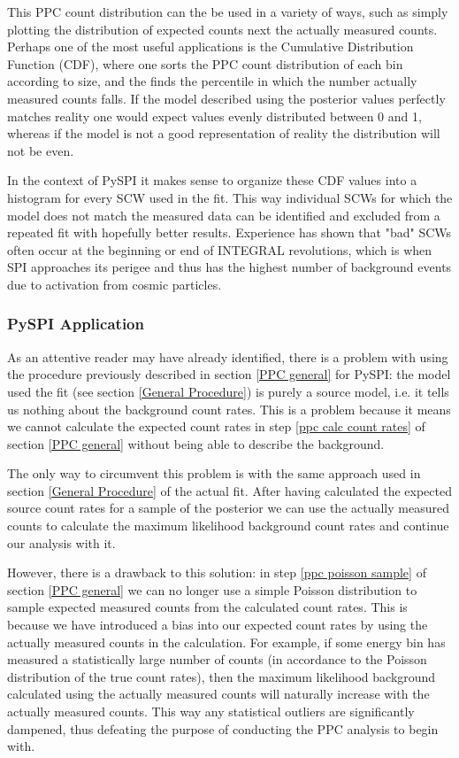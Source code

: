 \documentclass{report}
\begin{document}
This PPC count distribution can the be used in a variety of ways, such as simply plotting the distribution of expected counts next the actually measured counts. Perhaps one of the most useful applications is the Cumulative Distribution Function (CDF), where one sorts the PPC count distribution of each bin according to size, and the finds the percentile in which the number actually measured counts falls. If the model described using the posterior values perfectly matches reality one would expect values evenly distributed between 0 and 1, whereas if the model is not a good representation of reality the distribution will not be even. 

In the context of PySPI it makes sense to organize these CDF values into a histogram for every SCW used in the fit. This way individual SCWs for which the model does not match the measured data can be identified and excluded from a repeated fit with hopefully better results. Experience has shown that "bad" SCWs often occur at the beginning or end of INTEGRAL revolutions, which is when SPI approaches its perigee and thus has the highest number of background events due to activation from cosmic particles. 

\subsubsection{PySPI Application}
As an attentive reader may have already identified, there is a problem with using the procedure previously described in section \ref{PPC general} for PySPI: the model used the fit (see section \ref{General Procedure}) is purely a source model, i.e. it tells us nothing about the background count rates. This is a problem because it means we cannot calculate the expected count rates in step \ref{ppc calc count rates} of section \ref{PPC general} without being able to describe the background.

The only way to circumvent this problem is with the same approach used in section \ref{General Procedure} of the actual fit. After having calculated the expected source count rates for a sample of the posterior we can use the actually measured counts to calculate the maximum likelihood background count rates and continue our analysis with it.

However, there is a drawback to this solution: in step \ref{ppc poisson sample} of section \ref{PPC general} we can no longer use a simple Poisson distribution to sample expected measured counts from the calculated count rates. This is because we have introduced a bias into our expected count rates by using the actually measured counts in the calculation. For example, if some energy bin has measured a statistically large number of counts (in accordance to the Poisson distribution of the true count rates), then the maximum likelihood background calculated using the actually measured counts will naturally increase with the actually measured counts. This way any statistical outliers are significantly dampened, thus defeating the purpose of conducting the PPC analysis to begin with.
\end{document}
